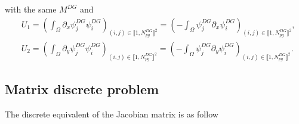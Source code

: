 \documentclass[a4paper, 11pt]{report}
\begin{document}
with the same $M^{DG}$ and 
\begin{equation*}
\begin{split}
&U_1=\left(\int_{\Omega}\partial_x\psi^{DG}_j\psi^{DG}_i\right)_{(i,j)\in\llbracket1,N_{pg}^{DG}\rrbracket^2}=\left(-\int_{\Omega}\psi^{DG}_j\partial_x\psi^{DG}_i\right)_{(i,j)\in\llbracket1,N_{pg}^{DG}\rrbracket^2},\\
&U_2=\left(\int_{\Omega}\partial_y\psi^{DG}_j\psi^{DG}_i\right)_{(i,j)\in\llbracket1,N_{pg}^{DG}\rrbracket^2}=\left(-\int_{\Omega}\psi^{DG}_j\partial_y\psi^{DG}_i\right)_{(i,j)\in\llbracket1,N_{pg}^{DG}\rrbracket^2}.
\end{split}
\end{equation*}


\subsection{Matrix discrete problem}
The discrete equivalent of the Jacobian matrix is as follow
\end{document}
